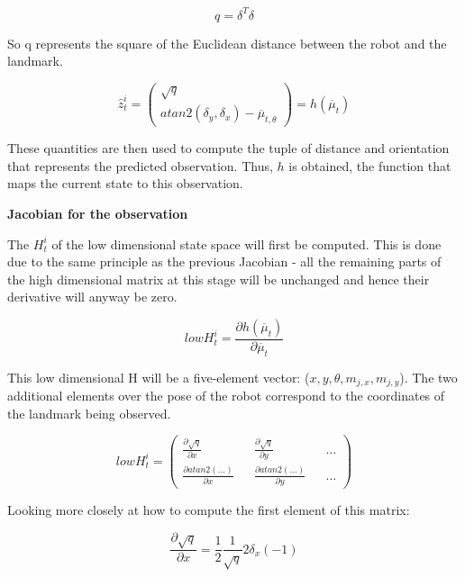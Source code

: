 \documentclass[a4paper]{article}
\begin{document}
\begin{equation*}
    q = \delta^T \delta
\end{equation*}

So q represents the square of the Euclidean distance between the robot and the landmark.

\begin{equation*}
    \hat{z}_t^i = 
    \begin{pmatrix}
            \sqrt{q} \\ atan2(\delta_y, \delta_x) - \overline{\mu}_{t, \theta}
    \end{pmatrix} 
    = 
    h(\overline{\mu}_t)
\end{equation*}

These quantities are then used to compute the tuple of distance and orientation that represents the predicted observation. Thus, $h$ is obtained, the function that maps the current state to this observation.

\textbf{Jacobian for the observation}

The $H_t^i$ of the low dimensional state space will first be computed. This is done due to the same principle as the previous Jacobian - all the remaining parts of the high dimensional matrix at this stage will be unchanged and hence their derivative will anyway be zero.

\begin{equation*}
    low H_t^i = 
    \frac{\partial h (\overline{\mu}_t)} {\partial \overline{\mu}_t}
\end{equation*}

This low dimensional H will be a five-element vector: ($x, y, \theta, m_{j,x}, m_{j,y}$). The two additional elements over the pose of the robot correspond to the coordinates of the landmark being observed.

\begin{equation*}
    low H_t^i = 
    \begin{pmatrix}
        \frac {\partial \sqrt{q}} {\partial x} && \frac {\partial \sqrt{q}} {\partial y} && \hdots
        \\
        \frac {\partial atan2(\ldots)} {\partial x} && \frac {\partial atan2(\ldots)} {\partial y} && \hdots
    \end{pmatrix}
\end{equation*}

Looking more closely at how to compute the first element of this matrix:

\begin{equation*}
    \frac {\partial \sqrt{q}} {\partial x} = \frac {1}{2} \frac {1} {\sqrt{q}} 2 \delta_x (-1)
\end{equation*}
\end{document}
